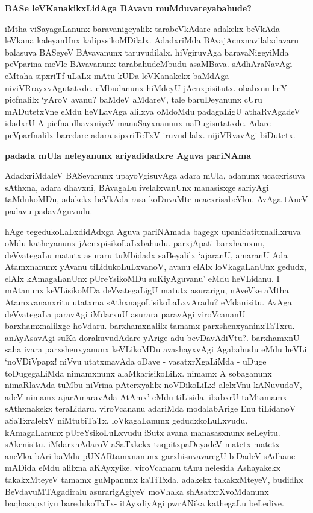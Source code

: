 {\bf BASe leVKanakikxLidAga BAvavu muMduvareyabahude?}

iMtha viSayagaLanunx baravanigeyalilx tarabeVkAdare adakekx beVkAda leVkana kaleyanUnx kalipxsikoMDilalx. AdadxriMda BAvajAcnxnavilalxdavaru balasuva BASeyeV BAvavanunx taruvudilalx. hiVgiruvAga baravaNigeyiMda peVparina meVle BAvavanunx tarabahudeMbudu asaMBava. sAdhAraNavAgi eMtaha sipxriTf uLaLx mAtu kUDa leVKanakekx baMdAga niviVRrayxvAgutatxde. eMbudanunx hiMdeyU jAcnxpisitutx. obabxnu heY picfnalilx `yAroV avanu? baMdeV aMdareV, tale baruDeyanunx cUru mADutetxVne eMdu heVLavAga alilxya oMdoMdu padagaLigU athaRvAgadeV idadxrU A picfna dhavxniyeV manuSayxnanunx naDugisutatxde. Adare peVparfnalilx baredare adara sipxriTeTxV iruvudilalx. nijiVRvavAgi biDutetx.

{\bf padada mUla neleyanunx ariyadidadxre Aguva pariNAma}

AdadxriMdaleV BASeyanunx upayoVgisuvAga adara mUla, adanunx ucacxrisuva sAthxna, adara dhavxni, BAvagaLu ivelalxvanUnx manasisxge sariyAgi taMdukoMDu, adakekx beVkAda rasa koDuvaMte ucacxrisabeVku. AvAga tAneV padavu padavAguvudu.

hAge tegedukoLaLxdidAdxga Aguva pariNAmada bagegx upaniSatitxnalilxruva oMdu katheyanunx jAcnxpisikoLaLxbahudu. parxjApati barxhamxnu, deVvategaLu matutx asuraru tuMbidadx saBeyalilx `ajaranU, amaranU Ada Atamxnanunx yAvanu tiLidukoLuLxvanoV, avanu elAlx loVkagaLanUnx gedudx, elAlx kAmagaLanUnx pUreYsikoMDu suKiyAguvanu' eMdu heVLidanu. I mAtanunx keVLisikoMDa deVvategaLigU matutx asurarigu, nAveVke aMtha Atamxvananxritu utatxma sAthxnagoLisikoLaLxvAradu? eMdanisitu. AvAga deVvategaLa paravAgi iMdarxnU asurara paravAgi viroVcananU barxhamxnalilxge hoVdaru. barxhamxnalilx tamamx parxshenxyaninxTaTxru. anAyAsavAgi suKa dorakuvudAdare yArige adu bevDavAdiVtu?. barxhamxnU saha ivara parxshenxyanunx keVLikoMDu avashayxvAgi Agabahudu eMdu heVLi `noVDiVpapx! niVvu utatxmavAda oDave - vasatxrXgaLiMda - uDuge toDugegaLiMda nimamxnunx alaMkarisikoLiLx. nimamx A sobaganunx nimaRlavAda tuMbu niVrina pAterxyalilx noVDikoLiLx! alelxVnu kANuvudoV, adeV nimamx ajarAmaravAda AtAmx' eMdu tiLisida. ibabxrU taMtamamx sAthxnakekx teraLidaru. viroVcananu adariMda modalabArige Enu tiLidanoV aSaTxralelxV niMtubiTaTx. loVkagaLanunx gedudxkoLuLxvudu. kAmagaLanunx pUreYsikoLuLxvudu iSutx avana manasasxnunx seLeyitu. sAkenisitu. iMdarxnAdaroV aSaTxkekx taqpitxpaDeyadeV matetx matetx aneVka bAri baMdu pUNARtamxnanunx garxhisuvavaregU biDadeV sAdhane mADida eMdu alilxna aKAyxyike. viroVcananu tAnu nelesida Ashayakekx takakxMteyeV tamamx guMpanunx kaTiTxda. adakekx takakxMteyeV, budidhx BeVdavuMTAgadiralu asurarigAgiyeV moVhaka shAsatxrXvoMdanunx baqhasapxtiyu baredukoTaTx- itAyxdiyAgi pwrANika kathegaLu beLedive.

